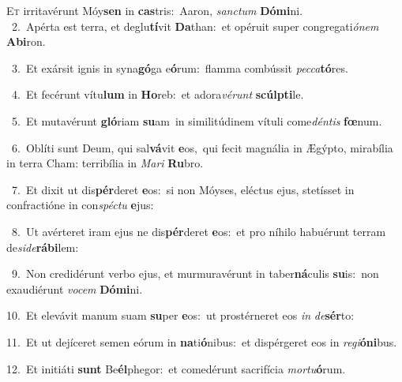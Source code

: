 \lettrine{\initial\textcolor{\initialcolor}{E}}{t} irritavérunt Móy\textbf{sen} in \textbf{cas}\-tris:~\star Aaron, \textit{sanc}\-\textit{tum} \textbf{Dó}\-\textbf{mi}ni.\\
{\numbfont\textcolor{\numbcolor}{~2.}}~Apérta est terra, et deglu\-\textbf{tí}\-vit \textbf{Da}\-than:~\star et opéruit super congregati\-\textit{ó}\-\textit{nem} \textbf{Ab}\-\textbf{i}ron.\par
{\numbfont\textcolor{\numbcolor}{~3.}}~Et exársit ignis in syna\-\textbf{gó}\-ga e\-\textbf{ó}\-rum:~\star flamma combússit \textit{pec}\-\textit{ca}\textbf{tó}res.\par
{\numbfont\textcolor{\numbcolor}{~4.}}~Et fecérunt vítu\textbf{lum} in \textbf{Ho}\-reb:~\star et adora\-\textit{vé}\-\textit{runt} \textbf{scúlp}\-\textbf{ti}le.\par
{\numbfont\textcolor{\numbcolor}{~5.}}~Et mutavérunt \textbf{gló}\-riam \textbf{su}\-am~\star in similitúdinem vítuli come\-\textit{dén}\-\textit{tis} \textbf{fœ}\-num.\par
{\numbfont\textcolor{\numbcolor}{~6.}}~Oblíti sunt Deum, qui sal\-\textbf{vá}\-vit \textbf{e}\-os,~\star qui fecit magnália in Ægýpto, mirabília in terra Cham: terribília in \textit{Ma}\-\textit{ri} \textbf{Ru}\-bro.\par
{\numbfont\textcolor{\numbcolor}{~7.}}~Et dixit ut dis\-\textbf{pér}\-deret \textbf{e}\-os:~\star si non Móyses, eléctus ejus, stetísset in confractióne in con\-\textit{spéc}\-\textit{tu} \textbf{e}\-jus:\par
{\numbfont\textcolor{\numbcolor}{~8.}}~Ut avérteret iram ejus ne dis\-\textbf{pér}\-deret \textbf{e}\-os:~\star et pro níhilo habuérunt terram de\-\textit{si}\-\textit{de}\textbf{rá}\textbf{bi}lem:\par
{\numbfont\textcolor{\numbcolor}{~9.}}~Non credidérunt verbo ejus, et murmuravérunt in taber\-\textbf{ná}\-culis \textbf{su}\-is:~\star non exaudiérunt \textit{vo}\-\textit{cem} \textbf{Dó}\-\textbf{mi}ni.\par
{\numbfont\textcolor{\numbcolor}{10.}}~Et elevávit manum suam \textbf{su}\-per \textbf{e}\-os:~\star ut prostérneret eos \textit{in} \textit{de}\-\textbf{sér}to:\par
{\numbfont\textcolor{\numbcolor}{11.}}~Et ut dejíceret semen eórum in \textbf{na}\-ti\-\textbf{ó}\-nibus:~\star et dispérgeret eos in \textit{re}\-\textit{gi}\textbf{ó}\textbf{ni}bus.\par
{\numbfont\textcolor{\numbcolor}{12.}}~Et initiáti \textbf{sunt} Be\-\textbf{él}\-phegor:~\star et comedérunt sacrifícia \textit{mor}\-\textit{tu}\textbf{ó}rum.\par
